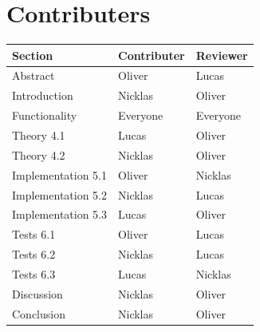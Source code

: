 \section*{Contributers}

\begin{table}[!htbp]
\centering
\begin{tabular}{|l|l|l|}
\hline

\textbf{Section}   & \textbf{Contributer} & \textbf{Reviewer} \\ \hline
Abstract           & Oliver               & Lucas             \\ \hline
Introduction       & Nicklas              & Oliver            \\ \hline
Functionality      & Everyone             & Everyone          \\ \hline
Theory 4.1         & Lucas                & Oliver            \\ \hline
Theory 4.2         & Nicklas              & Oliver            \\ \hline
Implementation 5.1 & Oliver               & Nicklas           \\ \hline
Implementation 5.2 & Nicklas              & Lucas             \\ \hline
Implementation 5.3 & Lucas                & Oliver            \\ \hline
Tests 6.1          & Oliver               & Lucas             \\ \hline
Tests 6.2          & Nicklas              & Lucas             \\ \hline
Tests 6.3          & Lucas                & Nicklas           \\ \hline
Discussion         & Nicklas              & Oliver            \\ \hline
Conclusion         & Nicklas              & Oliver            \\ \hline
\end{tabular}
\end{table}

